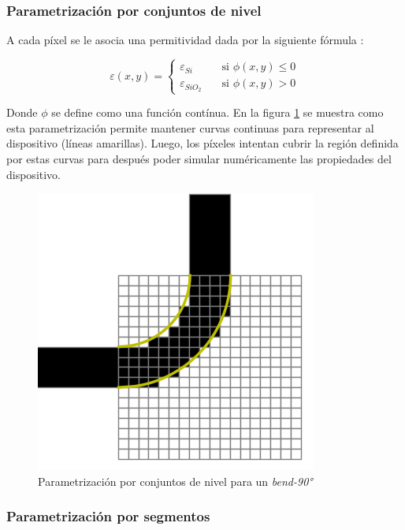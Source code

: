\subsubsection{Parametrización por conjuntos de nivel}

A cada píxel se le asocia una permitividad dada por la siguiente fórmula \citep{Piggott2017}:

  \[ \varepsilon(x, y) =
    \begin{cases}
      \varepsilon_{Si}       & \quad \text{si } \phi(x, y) \leq 0\\
      \varepsilon_{SiO_2}    & \quad \text{si } \phi(x, y) > 0
    \end{cases}
  \]

Donde $\phi$ se define como una función contínua. 
En la figura \ref{fig:levelsets} se muestra como esta parametrización permite mantener curvas continuas para representar al dispositivo (líneas amarillas).
Luego, los píxeles intentan cubrir la región definida por estas curvas para después poder simular numéricamente las propiedades del dispositivo.

\begin{figure}[h]
  \centering
  \includegraphics[scale=0.8]{image/theory/parametrization-levelsets.png}
  \caption{Parametrización por conjuntos de nivel para un \emph{bend-90°}}
  \label{fig:levelsets}
\end{figure}




\subsubsection{Parametrización por segmentos}

